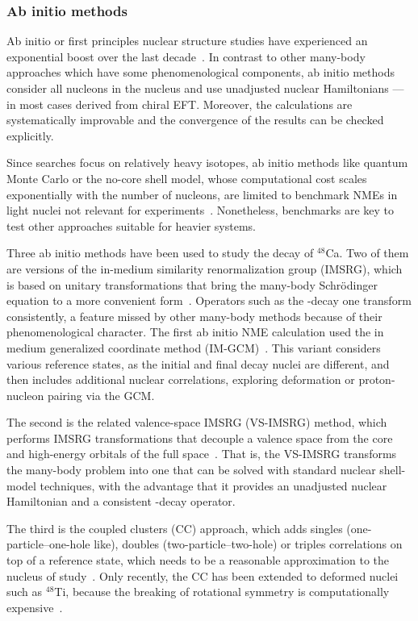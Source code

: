 \subsubsection{Ab initio methods}
\label{sec:ab_initio}

Ab initio or first principles nuclear structure studies have experienced an exponential boost over the last decade~\cite{Hergert:2020bxy,Ekstrom:2022yea}. In contrast to other many-body approaches which have some phenomenological components, ab initio methods consider all nucleons in the nucleus and use unadjusted nuclear Hamiltonians ---in most cases derived  from chiral EFT. Moreover, the calculations are systematically improvable and the convergence of the results can be checked explicitly.

Since \bbonu searches focus on relatively heavy isotopes, ab initio methods like quantum Monte Carlo or the no-core shell model, whose computational cost scales exponentially with the number of nucleons, are limited to benchmark NMEs in light nuclei not relevant for experiments~\cite{Pastore:2017ofx,Basili:2019gvn,Yao:2020olm}. Nonetheless, benchmarks are key to test other approaches suitable for heavier systems.

Three ab initio methods have been used to study the \bbonu decay of $^{48}$Ca. Two of them are versions of the in-medium similarity renormalization group (IMSRG), which is based on unitary transformations that bring the many-body Schr\"odinger equation to a more convenient form~\cite{Hergert:2015awm}. Operators such as the \bbonu-decay one transform consistently, a feature missed by other many-body methods because of their phenomenological character. The first ab initio NME calculation used the in medium generalized coordinate method (IM-GCM)~\cite{Yao:2020olm}. This variant considers various reference states, as the initial and final \bbonu decay nuclei are different, and then includes additional nuclear correlations, exploring deformation  or proton-nucleon pairing via the GCM.

The second is the related valence-space IMSRG (VS-IMSRG) method, which performs IMSRG transformations that decouple a valence space from the core and high-energy orbitals of the full space~\cite{Stroberg:2019mxo}. That is, the VS-IMSRG transforms the many-body problem into one that can be solved with standard nuclear shell-model techniques, with the advantage that it provides an unadjusted nuclear Hamiltonian and a consistent \bbonu-decay operator.

The third is the coupled clusters (CC) approach, which adds singles (one-particle--one-hole like), doubles (two-particle--two-hole) or triples correlations on top of a reference state, which needs to be a reasonable approximation to the nucleus of study~\cite{Hagen:2013nca}. Only recently, the CC has been extended to deformed nuclei such as $^{48}$Ti, because the breaking of rotational symmetry is computationally expensive~\cite{Novario:2020dmr}.

